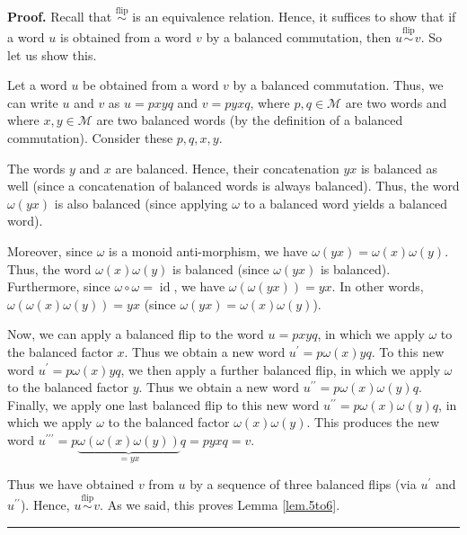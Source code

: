 \documentclass[numbers=enddot,12pt,final,onecolumn,notitlepage]{scrartcl}%
\theoremstyle{definition}
\newenvironment{proof}[1][Proof]{\noindent\textbf{#1.} }{\ \rule{0.5em}{0.5em}}
\newcommand{\id}{\operatorname{id}}
\newcommand{\M}{\mathcal{M}}
\newcommand{\flipsim}{\overset{\operatorname*{flip}}{\sim}}
\newenvironment{verlong}{}{}
\begin{document}
\begin{verlong}
\begin{proof}
Recall that $\flipsim$ is an equivalence relation.
Hence, it suffices to show that if a word $u$ is obtained from a word $v$ by
a balanced commutation, then $u \flipsim v$.
So let us show this.

Let a word $u$ be obtained from a word $v$ by a balanced commutation. Thus, we
can write $u$ and $v$ as $u=pxyq$ and $v=pyxq$, where $p,q\in\M$ are
two words and where $x,y\in\M$ are two balanced words (by the
definition of a balanced commutation). Consider these $p,q,x,y$.

The words $y$ and $x$ are balanced. Hence, their concatenation $yx$ is
balanced as well  (since a concatenation of balanced words is always
balanced). Thus, the word $\omega\left(  yx\right)  $ is also balanced (since
applying $\omega$ to a balanced word yields a balanced word).

Moreover, since $\omega$ is a monoid anti-morphism, we have $\omega\left(
yx\right)  =\omega\left(  x\right)  \omega\left(  y\right)  $. Thus, the word
$\omega\left(  x\right)  \omega\left(  y\right)  $ is balanced (since
$\omega\left(  yx\right)  $ is balanced). Furthermore, since $\omega
\circ\omega = \id$, we have $\omega\left(  \omega\left(
yx\right)  \right)  =yx$. In other words, $\omega\left(  \omega\left(
x\right)  \omega\left(  y\right)  \right)  =yx$ (since $\omega\left(
yx\right)  =\omega\left(  x\right)  \omega\left(  y\right)  $).

Now, we can apply a balanced flip to the word $u=pxyq$, in which we apply
$\omega$ to the balanced factor $x$. Thus we obtain a new word $u^{\prime
}=p\omega\left(  x\right)  yq$. To this new word $u^{\prime}
=p\omega\left(  x\right)  yq$, we then
apply a further balanced flip, in which we
apply $\omega$ to the balanced factor $y$. Thus we obtain a new word
$u^{\prime\prime}=p\omega\left(  x\right)  \omega\left(  y\right)  q$.
Finally, we apply one last balanced flip to this new word $u^{\prime\prime
}=p\omega\left(  x\right)  \omega\left(  y\right)  q$, in which we apply
$\omega$ to the balanced factor $\omega\left(  x\right)  \omega\left(
y\right)  $. This produces the new word $u^{\prime\prime\prime}%
=p\underbrace{\omega\left(  \omega\left(  x\right)  \omega\left(  y\right)
\right)  }_{=yx}q=pyxq=v$.

Thus we have obtained $v$ from $u$ by a sequence of three balanced flips (via
$u^{\prime}$ and $u^{\prime\prime}$). Hence, $u \flipsim v$. As we said, this proves Lemma \ref{lem.5to6}.
\end{proof}
\end{verlong}
\end{document}
